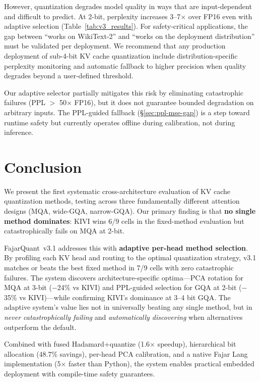 \documentclass[10pt,twocolumn]{article}
\begin{document}
However, quantization degrades model quality in ways that are
input-dependent and difficult to predict. At 2-bit, perplexity
increases 3--7$\times$ over FP16 even with adaptive selection
(Table~\ref{tab:v3_results}). For safety-critical applications, the
gap between ``works on WikiText-2'' and ``works on the deployment
distribution'' must be validated per deployment. We recommend that any
production deployment of sub-4-bit KV cache quantization include
distribution-specific perplexity monitoring and automatic fallback to
higher precision when quality degrades beyond a user-defined threshold.

Our adaptive selector partially mitigates this risk by eliminating
catastrophic failures (PPL $>$ 50$\times$ FP16), but it does not
guarantee bounded degradation on arbitrary inputs. The PPL-guided
fallback (\S\ref{sec:ppl-mse-gap}) is a step toward runtime safety
but currently operates offline during calibration, not during inference.

\section{Conclusion}

We present the first systematic cross-architecture evaluation of KV
cache quantization methods, testing across three fundamentally different
attention designs (MQA, wide-GQA, narrow-GQA). Our primary finding is
that \textbf{no single method dominates}: KIVI wins 6/9 cells in the
fixed-method evaluation but catastrophically fails on MQA at 2-bit.

FajarQuant~v3.1 addresses this with \textbf{adaptive per-head method
selection}. By profiling each KV head and routing to the optimal
quantization strategy, v3.1 matches or beats the best fixed method in
7/9 cells with zero catastrophic failures. The system discovers
architecture-specific optima---PCA rotation for MQA at 3-bit ($-$24\%
vs KIVI) and PPL-guided selection for GQA at 2-bit ($-$35\% vs
KIVI)---while confirming KIVI's dominance at 3--4 bit GQA. The
adaptive system's value lies not in universally beating any single
method, but in \emph{never catastrophically failing} and
\emph{automatically discovering} when alternatives outperform the
default.

Combined with fused Hadamard+quantize (1.6$\times$ speedup),
hierarchical bit allocation (48.7\% savings), per-head PCA calibration,
and a native Fajar Lang implementation (5$\times$ faster than Python),
the system enables practical embedded deployment with compile-time
safety guarantees.
\end{document}
